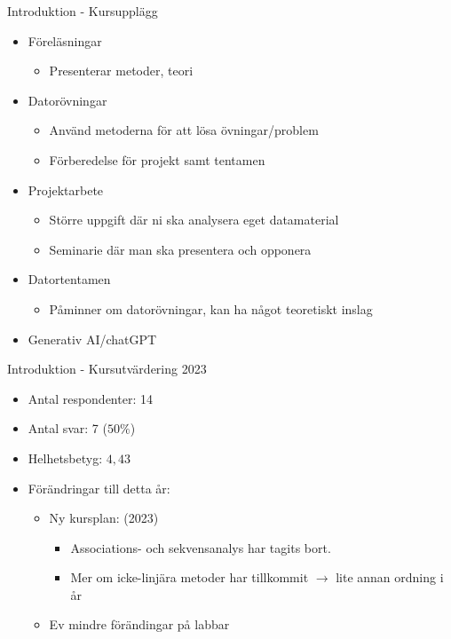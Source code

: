\documentclass[10pt,english]{beamer}
\begin{document}
\begin{frame}{Introduktion - Kursupplägg}
    \begin{itemize}
        \item Föreläsningar
        \begin{itemize}
            \item Presenterar metoder, teori
        \end{itemize}
        \item Datorövningar
        \begin{itemize}
            \item Använd metoderna för att lösa övningar/problem
            \item Förberedelse för projekt samt tentamen
        \end{itemize}
        \item Projektarbete
        \begin{itemize}
            \item Större uppgift där ni ska analysera eget datamaterial
            \item Seminarie där man ska presentera och opponera
        \end{itemize}
        \item Datortentamen
        \begin{itemize}
            \item Påminner om datorövningar, kan ha något teoretiskt inslag
        \end{itemize}
        \item Generativ AI/chatGPT
    \end{itemize}
    
\end{frame}

\begin{frame}{Introduktion - Kursutvärdering 2023}
    \begin{itemize}
        \item Antal respondenter: 14
        \item Antal svar: 7 ($50\%$)
        \item Helhetsbetyg: $4,43$
        \item Förändringar till detta år:
        \begin{itemize}
            \item Ny kursplan: (2023)
            \begin{itemize}
                \item Associations- och sekvensanalys har tagits bort.
                \item Mer om icke-linjära metoder har tillkommit $\rightarrow$ lite annan ordning i år
            \end{itemize}
            \item Ev mindre förändingar på labbar
        \end{itemize}
    \end{itemize}
\end{frame}
\end{document}
